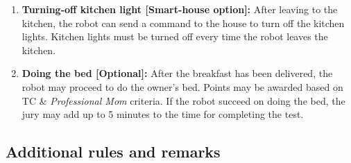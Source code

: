 \begin{enumerate}
	\item \textbf{Turning-off kitchen light [Smart-house option]:} After leaving to the kitchen, the robot can send a command to the house to turn off the kitchen lights. Kitchen lights must be turned off every time the robot leaves the kitchen.


	\item \textbf{Doing the bed [Optional]:} After the breakfast has been delivered, the robot may proceed to do the owner's bed. Points may be awarded based on TC \&  \textit{Professional Mom} criteria. If the robot succeed on doing the bed, the jury may add up to 5 minutes to the time for completing the test.

\end{enumerate}

\subsection{Additional rules and remarks}

